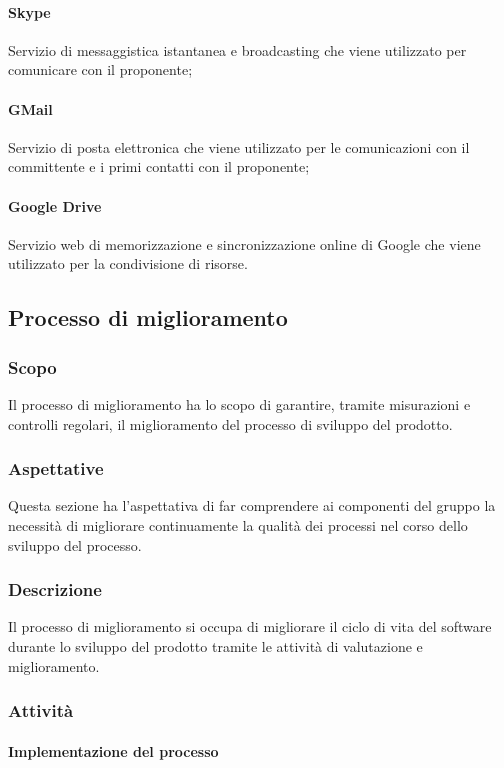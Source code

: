 \paragraph{Skype} 
Servizio di messaggistica istantanea e broadcasting che viene utilizzato per comunicare con il proponente;
\paragraph{GMail} 
Servizio di posta elettronica che viene utilizzato per le comunicazioni con il committente e i primi contatti con il proponente;
\paragraph{Google Drive} 
Servizio web di memorizzazione e sincronizzazione online di Google che viene utilizzato per la condivisione di risorse.


\newpage

\subsection{Processo di miglioramento}
\subsubsection{Scopo}
Il processo di miglioramento ha lo scopo di garantire, tramite misurazioni e controlli regolari, il miglioramento del processo di sviluppo del prodotto.

\subsubsection{Aspettative}
Questa sezione ha l'aspettativa di far comprendere ai componenti del gruppo la necessità di migliorare continuamente la qualità dei processi nel corso dello sviluppo del processo.


\subsubsection{Descrizione}
Il processo di miglioramento si occupa di migliorare il ciclo di vita del software durante lo sviluppo del prodotto tramite le attività di valutazione e miglioramento.


\subsubsection{Attività}
\paragraph{Implementazione del processo}


